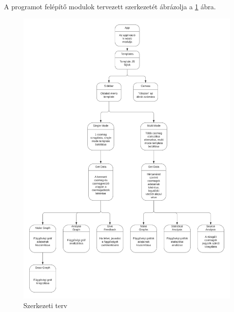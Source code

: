 \noindent A programot felépítő modulok tervezett szerkezetét ábrázolja a \ref{fig:struct_plan} ábra.

\begin{figure}[!h]
	\centering
	\includegraphics[scale=0.7]{images/struct_plan.png}
	\caption{Szerkezeti terv}
	\label{fig:struct_plan}
\end{figure}


 
